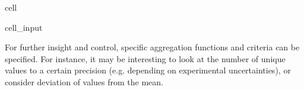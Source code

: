 \documentclass[letterpaper,table,10pt,english]{jupyterBook}
\begin{document}
\begin{sphinxuseclass}{cell}\begin{sphinxVerbatimInput}

\begin{sphinxuseclass}{cell_input}
\begin{sphinxVerbatim}[commandchars=\\\{\}]
\end{sphinxVerbatim}

\end{sphinxuseclass}\end{sphinxVerbatimInput}

\end{sphinxuseclass}
\sphinxAtStartPar
For further insight and control, specific aggregation functions and criteria can be specified. For instance, it may be interesting to look at the number of unique values to a certain precision (e.g. depending on experimental uncertainties), or consider deviation of values from the mean.
\end{document}
